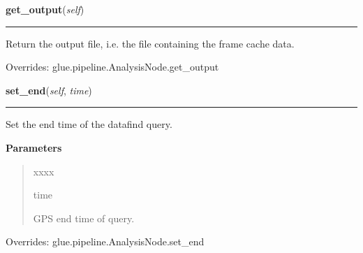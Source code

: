     \begin{boxedminipage}{\textwidth}

    \raggedright \textbf{get\_output}(\textit{self})

    \vspace{-1.5ex}

    \rule{\textwidth}{0.5\fboxrule}
    Return the output file, i.e. the file containing the frame cache 
    data.

    \vspace{1ex}

      Overrides: glue.pipeline.AnalysisNode.get\_output

    \end{boxedminipage}

    \label{stochastic:LSCDataFindNode:set_end}
    \vspace{0.5ex}

    \begin{boxedminipage}{\textwidth}

    \raggedright \textbf{set\_end}(\textit{self}, \textit{time})

    \vspace{-1.5ex}

    \rule{\textwidth}{0.5\fboxrule}
    Set the end time of the datafind query.

    \vspace{1ex}

      \textbf{Parameters}
      \begin{quote}
        \begin{Ventry}{xxxx}

          \item[time]

          GPS end time of query.

        \end{Ventry}

      \end{quote}

    \vspace{1ex}

      Overrides: glue.pipeline.AnalysisNode.set\_end

    \end{boxedminipage}

    \label{stochastic:LSCDataFindNode:set_observatory}
    \vspace{0.5ex}

